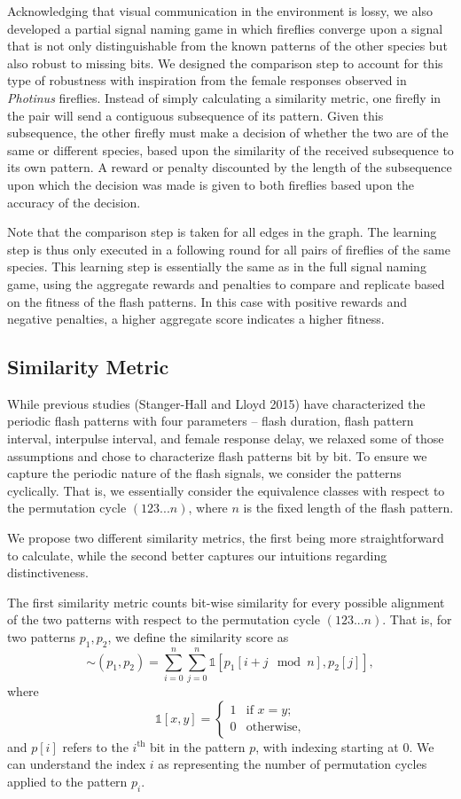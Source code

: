 Acknowledging that visual communication in the environment is lossy, we also developed a partial signal naming game in which fireflies converge upon a signal that is not only distinguishable from the known patterns of the other species but also robust to missing bits. 
We designed the comparison step to account for this type of robustness with inspiration from the female responses observed in {\it Photinus} fireflies. 
Instead of simply calculating a similarity metric, one firefly in the pair will send a contiguous subsequence of its pattern. Given this subsequence, the other firefly must make a decision of whether the two are of the same or different species, based upon the similarity of the received subsequence to its own pattern. 
A reward or penalty discounted by the length of the subsequence upon which the decision was made is given to both fireflies based upon the accuracy of the decision. 

Note that the comparison step is taken for all edges in the graph. The learning step is thus only executed in a following round for all pairs of fireflies of the same species. 
This learning step is essentially the same as in the full signal naming game, using the aggregate rewards and penalties to compare and replicate based on the fitness of the flash patterns. 
In this case with positive rewards and negative penalties, a higher aggregate score indicates a higher fitness. 


\subsection{Similarity Metric}
While previous studies (Stanger-Hall and Lloyd 2015) have characterized the periodic flash patterns with four parameters -- flash duration, flash pattern interval, interpulse interval, and female response delay, we relaxed some of those assumptions and chose to characterize flash patterns bit by bit. 
To ensure we capture the periodic nature of the flash signals, we consider the patterns cyclically. That is, we essentially consider the equivalence classes with respect to the permutation cycle $(1 2 3 ... n)$, where $n$ is the fixed length of the flash pattern. 

We propose two different similarity metrics, the first being more straightforward to calculate, while the second better captures our intuitions regarding distinctiveness. 

The first similarity metric counts bit-wise similarity for every possible alignment of the two patterns with respect to the permutation cycle $(1 2 3 ... n)$. That is, for two patterns $p_1, p_2$, we define the similarity score as
\[ \sim (p_1, p_2) = \sum_{i=0}^n \sum_{j=0}^n \mathbb1 \left[p_1 [i+j \mod n], p_2[j] \right] ,\]
where 
\[ \mathbb1 [x,y] = \begin{cases} 1 &\textrm{if } x = y ; \\ 0 &\textrm{otherwise,} \end{cases} \] 
and 
$p[i]$ refers to the $i^{\textrm{th}}$ bit in the pattern $p$, with indexing starting at 0.
We can understand the index $i$ as representing the number of permutation cycles applied to the pattern $p_i$. 

